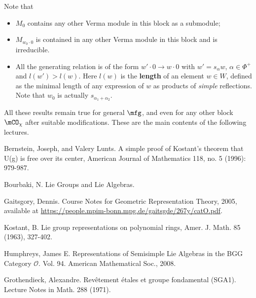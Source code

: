 	Note that
	\begin{itemize}
		\item $M_0$ contains any other Verma module in this block as a submodule;
		\item $M_{w_0\cdot 0}$ is contained in any other Verma module in this block and is irreducible.
		\item All the generating relation is of the form $w' \cdot 0 \to w\cdot 0$ with $w'=s_\alpha w$, $\alpha\in \Phi^+$ and $l(w')> l(w)$. Here $l(w)$ is the \textbf{length} of an element $w\in W$, defined as the minimal length of any expression of $w$ as products of \emph{simple} reflections. Note that $w_0$ is actually $s_{\alpha_1+\alpha_2}$.
	\end{itemize}
	All these results remain true for general $\mfg$, and even for any other block $\mCO_\chi$ after suitable modifications. These are the main contents of the following lectures.

	
\begin{thebibliography}{Yau}
	
	 Bernstein, Joseph, and Valery Lunts. A simple proof of Kostant's theorem that U(g) is free over its center, American Journal of Mathematics 118, no. 5 (1996): 979-987.

	 Bourbaki, N. Lie Groups and Lie Algebras.

	 Gaitsgory, Dennis. Course Notes for Geometric Representation Theory, 2005, available at \url{https://people.mpim-bonn.mpg.de/gaitsgde/267y/catO.pdf}.

	 Kostant, B. Lie group representations on polynomial rings, Amer. J. Math. 85 (1963), 327-402.

	 Humphreys, James E. Representations of Semisimple Lie Algebras in the BGG Category $\mathcal{O} $. Vol. 94. American Mathematical Soc., 2008.

	 Grothendieck, Alexandre. Revêtement étales et groupe fondamental (SGA1). Lecture Notes in Math. 288 (1971).


\end{thebibliography}

 



